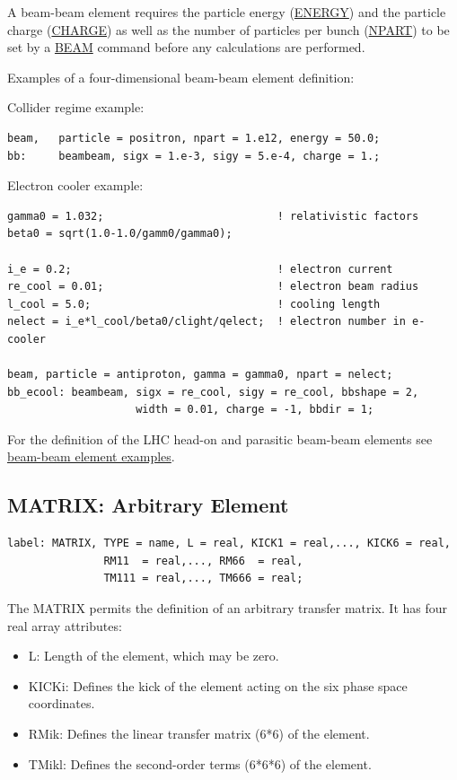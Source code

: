 A beam-beam element requires the particle energy
(\href{beam.html#energy}{ENERGY})
and the particle charge
(\href{beam.html#charge}{CHARGE})
as well as the number of particles per bunch 
(\href{beam.html#npart}{NPART})
to be set by a \href{beam.html}{BEAM} command
before any calculations are performed.


Examples of a four-dimensional beam-beam element definition:
 
Collider regime example:
\begin{verbatim}
beam,   particle = positron, npart = 1.e12, energy = 50.0;
bb:     beambeam, sigx = 1.e-3, sigy = 5.e-4, charge = 1.;
\end{verbatim}


Electron cooler example: 
\begin{verbatim}
gamma0 = 1.032;                           ! relativistic factors
beta0 = sqrt(1.0-1.0/gamm0/gamma0);

i_e = 0.2;                                ! electron current
re_cool = 0.01;                           ! electron beam radius
l_cool = 5.0;                             ! cooling length
nelect = i_e*l_cool/beta0/clight/qelect;  ! electron number in e-cooler

beam, particle = antiproton, gamma = gamma0, npart = nelect; 
bb_ecool: beambeam, sigx = re_cool, sigy = re_cool, bbshape = 2, 
                    width = 0.01, charge = -1, bbdir = 1;
\end{verbatim}

For the definition of the LHC head-on and parasitic beam-beam elements see 
 \href{../control/foot.html#macro}{beam-beam element examples}.


%
\subsection{MATRIX: Arbitrary Element}

\begin{verbatim}
label: MATRIX, TYPE = name, L = real, KICK1 = real,..., KICK6 = real,
               RM11  = real,..., RM66  = real,
               TM111 = real,..., TM666 = real;
\end{verbatim} 

The MATRIX permits the definition of an arbitrary transfer matrix. 
It has four real array attributes: 
\begin{itemize}
   \item L: Length of the element, which may be zero. 
   \item KICKi: Defines the kick of the element acting on the six phase
     space coordinates.  
   \item RMik: Defines the linear transfer matrix (6*6) of the element.  
   \item TMikl: Defines the second-order terms (6*6*6) of the element. 
\end{itemize} 

